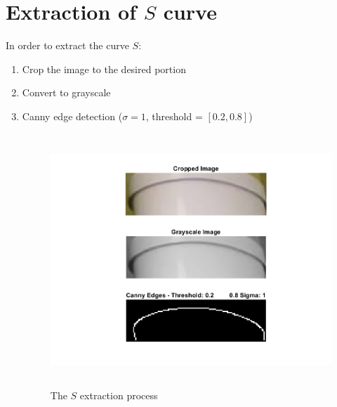 \section{Extraction of $S$ curve}

In order to extract the curve $S$:
\begin{enumerate}
    \item Crop the image to the desired portion
    \item Convert to grayscale
    \item Canny edge detection ($\sigma = 1$, threshold = $[0.2, 0.8]$)
                        \begin{figure}[H]
    \centering
    \includegraphics[height=9.5cm, width=\textwidth, keepaspectratio]{Report/Images/Features/S/CannyEdges.png}
    \caption{\label{fig:S extraction}The $S$ extraction process}
    \end{figure}
\end{enumerate}